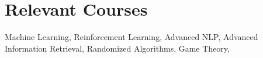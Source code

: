 \documentclass[10pt,a4paper,roman,colorlinks,linkcolor=true]{moderncv}        %
\makeatletter
\newcommand*{\customcvproject}[4][.25em]{
  \begin{tabular}{@{}l}
    {\bfseries #2}
  \end{tabular}
  \hfill%
  \begin{tabular}{l@{}}
    {\itshape #3}
  \end{tabular}
  \ifx&#4&%
  \else{\\%
    \begin{minipage}{\maincolumnwidth}%
      \small#4%
  \end{minipage}}\fi%
\par\addvspace{#1}}
\makeatother
\begin{document}
\section{Relevant Courses}
Machine Learning, Reinforcement Learning, Advanced NLP, 
Advanced Information Retrieval, Randomized Algorithms, 
Game Theory,
\end{document}
